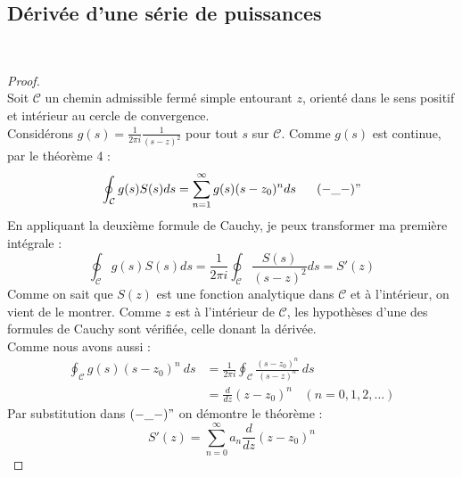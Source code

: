 	\subsection{Dérivée d'une série de puissances}
	\ \\	
	\begin{proof}\ \\
	Soit $\mathcal{C}$ un chemin admissible fermé simple entourant $z$, orienté dans le sens 
	positif et intérieur au cercle de convergence.\\
	Considérons $g(s) = \frac{1}{2\pi i}\frac{1}{(s-z)^2}$ pour tout $s$ sur $\mathcal{C}$.
	Comme $g(s)$ est continue, par le théorème 4 :
	\begin{equation}
	\oint_\mathcal{C}g(s) S(s) ds = \sum_{n=1}^\infty g(s)(s-z_0)^n ds\ \ \ \ \ (-\_-)"
	\end{equation}
	En appliquant la deuxième formule de Cauchy, je peux transformer ma première intégrale :
	\begin{equation}
	\oint_\mathcal{C}g(s) S(s) ds = \frac{1}{2\pi i}\oint_\mathcal{C}\frac{S(s)}{(s-z)^2}ds = 
	S'(z)
	\end{equation}
	Comme on sait que $S(z)$ est une fonction analytique dans $\mathcal{C}$ et à l'intérieur, 
	on vient de le montrer. Comme $z$ est à l'intérieur de $\mathcal{C}$, les hypothèses d'une 
	des formules de Cauchy sont vérifiée, celle donant la dérivée. \\
	Comme nous avons aussi :
	\begin{equation}
	\begin{array}{ll}
	\oint_\mathcal{C} g(s)(s-z_0)^n\ ds &= \frac{1}{2\pi i}\oint_\mathcal{C}\frac{(s-z_0)^n}{
	(s-z)^n}\ ds\\
	 &= \frac{d}{dz}(z-z_0)^n\ \ \ \ (n=0,1,2,\dots)
	\end{array}
	\end{equation}
	Par substitution dans $(-\_-)"$ on démontre le théorème :
	\begin{equation}
	S'(z) = \sum_{n=0}^\infty a_n\frac{d}{dz}(z-z_0)^n
	\end{equation}
	\end{proof}

